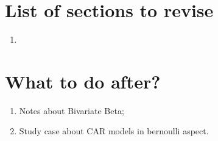 \listoftodos

\section*{List of sections to revise}

\begin{enumerate}
    \item 
\end{enumerate}

\section*{What to do after?}

\begin{enumerate}
    \item Notes about Bivariate Beta;
    \item Study case about CAR models in bernoulli aspect. 
\end{enumerate}